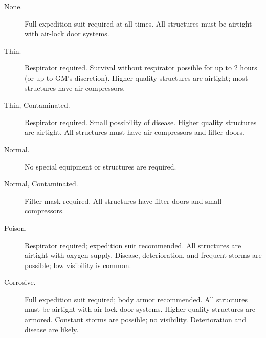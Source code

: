 \begin{description}
\item[None.] Full expedition suit required at all times. All
  structures must be airtight with air-lock door systems.
\item[Thin.] Respirator required. Survival without respirator possible
  for up to 2 hours (or up to GM's discretion). Higher quality
  structures are airtight; most structures have air compressors.
\item[Thin, Contaminated.] Respirator required. Small possibility of
  disease. Higher quality structures are airtight. All structures must
  have air compressors and filter doors.
\item[Normal.] No special equipment or structures are required.
\item[Normal, Contaminated.] Filter mask required. All structures have
  filter doors and small compressors.
\item[Poison.] Respirator required; expedition suit recommended. All
  structures are airtight with oxygen supply. Disease, deterioration,
  and frequent storms are possible; low visibility is common.
\item[Corrosive.] Full expedition suit required; body armor
  recommended. All structures must be airtight with air-lock door
  systems. Higher quality structures are armored. Constant storms are
  possible; no visibility. Deterioration and disease are likely.
\end{description}

